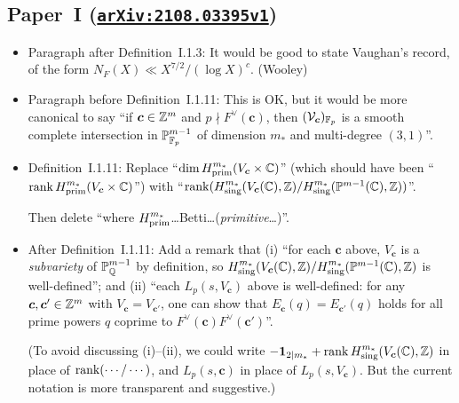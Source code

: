 \documentclass[12pt]{article}
\begin{document}
\subsection{Paper~I (\href{https://arxiv.org/abs/2108.03395v1}{\texttt{arXiv:2108.03395v1}})}

\begin{itemize}
    \item Paragraph after Definition~I.1.3:
    It would be good to state Vaughan's record, of the form $N_F(X)\ll X^{7/2}/(\log{X})^c$.
    (Wooley)
    
    \item Paragraph before Definition~I.1.11:
    This is OK,
    but it would be more canonical to say ``if $\bm{c}\in \mathbb{Z}^m$ and $p\nmid F^\vee(\bm{c})$, then $(\mathcal{V}_{\bm{c}})_{\mathbb{F}_p}$ is a smooth complete intersection in $\mathbb{P}^{m-1}_{\mathbb{F}_p}$ of dimension $m_\ast$ and multi-degree $(3,1)$''.
    
    \item Definition~I.1.11:
    Replace ``$\dim H^{m_\ast}_{\operatorname{prim}}(V_{\bm{c}}\times\mathbb{C})$'' (which should have been ``$\operatorname{rank} H^{m_\ast}_{\operatorname{prim}}(V_{\bm{c}}\times\mathbb{C})$'')
    with ``$\operatorname{rank}(H^{m_\ast}_\textnormal{sing}(V_{\bm{c}}(\mathbb{C}),\mathbb{Z})/H^{m_\ast}_\textnormal{sing}(\mathbb{P}^{m-1}(\mathbb{C}),\mathbb{Z}))$''.
    
    Then delete ``where $H^{m_\ast}_{\operatorname{prim}}$\dots Betti\dots (\emph{primitive}\dots)''.
    
    \item After Definition~I.1.11:
    Add a remark that
    (i) ``for each $\bm{c}$ above,
    $V_{\bm{c}}$ is a \emph{subvariety} of $\mathbb{P}^{m-1}_{\mathbb{Q}}$ by definition,
    so $H^{m_\ast}_\textnormal{sing}(V_{\bm{c}}(\mathbb{C}),\mathbb{Z})/H^{m_\ast}_\textnormal{sing}(\mathbb{P}^{m-1}(\mathbb{C}),\mathbb{Z})$ is well-defined'';
    and (ii) ``each $L_p(s,V_{\bm{c}})$ above is well-defined:
    for any $\bm{c},\bm{c}'\in \mathbb{Z}^m$ with $V_{\bm{c}}=V_{\bm{c}'}$,
    one can show that $E_{\bm{c}}(q) = E_{\bm{c}'}(q)$ holds for all prime powers $q$ coprime to $F^\vee(\bm{c})F^\vee(\bm{c}')$''.
    
    (To avoid discussing (i)--(ii),
    we could write $-\bm{1}_{2\mid m_\ast} + \operatorname{rank} H^{m_\ast}_\textnormal{sing}(V_{\bm{c}}(\mathbb{C}),\mathbb{Z})$ in place of $\operatorname{rank}(\cdots/\cdots)$,
    and $L_p(s,\bm{c})$ in place of $L_p(s,V_{\bm{c}})$.
    But the current notation is more transparent and suggestive.)
    
\end{itemize}
\end{document}
